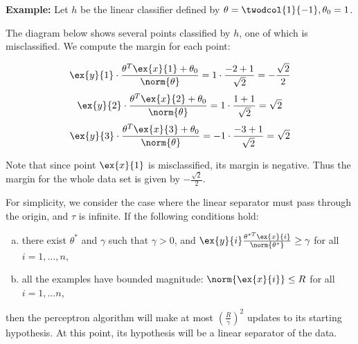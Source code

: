 \begin{examplebox}{\bf Example:}
  Let $h$ be the linear classifier defined by $\theta = \protect\twodcol{1}{-1}, \theta_0 = 1$.

  \bigskip
  \noindent
  The diagram below shows several points classified by $h$, one of which is misclassified.  We compute the margin for each point:

  \begin{center}
    $$ \ex{y}{1} \cdot \frac{\theta^T \ex{x}{1} + \theta_0}{\norm{\theta}} = 1 \cdot \frac{-2 + 1}{\sqrt{2}} = -\frac{\sqrt{2}}{2} $$
    $$ \ex{y}{2} \cdot \frac{\theta^T \ex{x}{2} + \theta_0}{\norm{\theta}} = 1 \cdot \frac{1 + 1}{\sqrt{2}} = \sqrt{2} $$
    $$ \ex{y}{3} \cdot \frac{\theta^T \ex{x}{3} + \theta_0}{\norm{\theta}} = -1 \cdot \frac{-3 + 1}{\sqrt{2}} = \sqrt{2} $$
  \end{center}

  Note that since point $\ex{x}{1}$ is misclassified, its margin is negative.  Thus the margin for the whole data set is given by $-\frac{\sqrt{2}}{2}$.
\end{examplebox}

\begin{theorem}
  For simplicity, we consider the case where the linear separator must
  pass through the origin, and $\tau$ is infinite. If the following conditions hold:
  \begin{enumerate}[(a)]
    \item there exist $\theta^*$ and $\gamma$ such that $\gamma > 0$, and
          $\ex{y}{i} \frac{\theta^{*T}\ex{x}{i}}{\norm{\theta^*}}
            \geq \gamma$
          for all $i = 1, \ldots, n$,
    \item all the examples have bounded magnitude: $\norm{\ex{x}{i}} \leq R$
          for all $i = 1, \ldots n$,
  \end{enumerate}
  then the perceptron algorithm will make at most $\left(\frac{R}{\gamma}
    \right)^2$ updates to its starting hypothesis. At this point, its hypothesis
  will be a linear separator of the data.
\end{theorem}

